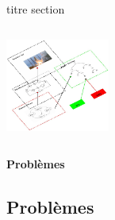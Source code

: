 \begin{frame}{titre section}
\begin{columns}[onlytextwidth,t]
{	}
	\only<6->
	{
		\includegraphics[height=1.2in,width=\columnwidth,clip=true,trim={0 0 0 0}]{resources/mc/0006}
	}
\end{columns}

\end{frame}

\begin{frame}
\centering
\vspace{2.2cm}       
\Huge 
\textbf{Problèmes}
\end{frame}
\subsection{Problèmes}

